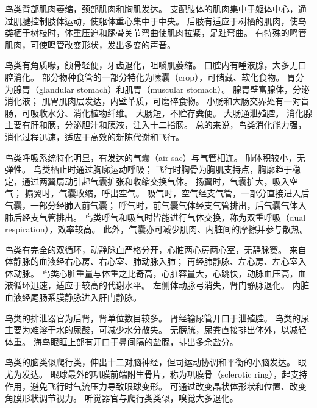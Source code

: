 \documentclass[11pt]{article}
\begin{document}
\newline

鸟类背部肌肉萎缩，颈部肌肉和胸肌发达。
支配肢体的肌肉集中于躯体中心，通过肌腱控制肢体运动，使躯体重心集中于中央。
后肢有适应于树栖的肌肉，使鸟类栖于树枝时，体重压迫和腿骨关节弯曲使肌肉拉紧，足趾弯曲。
有特殊的鸣管肌肉，可使鸣管改变形状，发出多变的声音。

\newline

鸟类有角质喙，颌骨轻便，牙齿退化，咀嚼肌萎缩。
口腔内有唾液腺，大多无口腔消化。
部分物种食管的一部分特化为嗉囊（crop），可储藏、软化食物。
胃分为腺胃（glandular stomach）和肌胃（muscular stomach）。
腺胃壁富腺体，分泌消化液；
肌胃肌肉层发达，内壁革质，可磨碎食物。
小肠和大肠交界处有一对盲肠，可吸收水分、消化植物纤维。
大肠短，不贮存粪便。
大肠通泄殖腔。
消化腺主要有肝和胰，分泌胆汁和胰液，注入十二指肠。
总的来说，鸟类消化能力强，消化过程迅速，适应于高效的新陈代谢和飞行。

\newline

鸟类呼吸系统特化明显，有发达的气囊（air sac）与气管相连。
肺体积较小，无弹性。
鸟类栖止时通过胸廓运动呼吸；
飞行时胸骨为胸肌支持点，胸廓趋于稳定，通过两翼扇动引起气囊扩张和收缩交换气体。
扬翼时，气囊扩大，吸入空气；
搧翼时，气囊收缩，呼出空气。
吸气时，空气经支气管，一部分直接进入后气囊，一部分经肺入前气囊；
呼气时，前气囊气体经支气管排出，后气囊气体入肺后经支气管排出。
鸟类呼气和吸气时皆能进行气体交换，称为双重呼吸（dual respiration），效率较高。
此外，气囊亦可减少肌肉、内脏间的摩擦并参与散热。

\newline

鸟类有完全的双循环，动静脉血严格分开，心脏两心房两心室，无静脉窦。
来自体静脉的血液经右心房、右心室、肺动脉入肺；
再经肺静脉、左心房、左心室入体动脉。
鸟类心脏重量与体重之比奇高，心脏容量大，心跳快，动脉血压高，血液循环迅速，适应于较高的代谢水平。
左侧体动脉弓消失，肾门静脉退化。
内脏血液经尾肠系膜静脉进入肝门静脉。

\newline

鸟类的排泄器官为后肾，肾单位数目较多。
肾经输尿管开口于泄殖腔。
鸟类的尿主要为难溶于水的尿酸，可减少水分散失。
无膀胱，尿粪直接排出体外，以减轻体重。
海鸟眼眶上部有开口于鼻间隔的盐腺，排出多余盐分。

\newline

鸟类的脑类似爬行类，伸出十二对脑神经，但司运动协调和平衡的小脑发达。
眼尤为发达。
眼球最外的巩膜前端附生骨片，称为巩膜骨（sclerotic ring），起支持作用，避免飞行时气流压力导致眼球变形。
可通过改变晶状体形状和位置、改变角膜形状调节视力。
听觉器官与爬行类类似，嗅觉大多退化。
\end{document}
